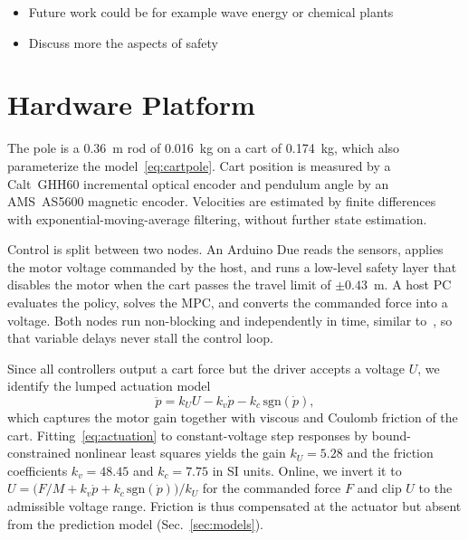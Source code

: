 \documentclass{l4dc2027}
\let\cite\citep
\begin{document}
\begin{itemize}
    \item Future work could be for example wave energy or chemical plants
    \item Discuss more the aspects of safety
\end{itemize}




\appendix

\section{Hardware Platform}
\label{app:hardware}
The pole is a 0.36~m rod of 0.016~kg on a cart of 0.174~kg, which also
parameterize the model~\eqref{eq:cartpole}. Cart position is measured by a
Calt~GHH60 incremental optical encoder and pendulum angle by an AMS~AS5600
magnetic encoder. Velocities are estimated by finite differences with
exponential-moving-average filtering, without further state estimation.

Control is split between two nodes. An Arduino Due reads the sensors, applies
the motor voltage commanded by the host, and runs a low-level safety layer
that disables the motor when the cart passes the travel limit of
$\pm0.43$~m. A host PC evaluates the policy, solves the MPC,  and converts the
commanded force into a voltage. Both nodes run non-blocking and independently
in time, similar to~\cite{bohm2022nonblocking}, so that variable delays never
stall the control loop.

Since all controllers output a cart force but the driver accepts a voltage
$U$, we identify the lumped actuation model
\begin{equation}
  \ddot p = k_U U - k_v\dot p - k_c\,\mathrm{sgn}(\dot p),
  \label{eq:actuation}
\end{equation}
which captures the motor gain together with viscous and Coulomb friction of
the cart. Fitting~\eqref{eq:actuation} to constant-voltage step responses by
bound-constrained nonlinear least squares yields the gain $k_U=5.28$ and the
friction coefficients $k_v=48.45$ and $k_c=7.75$ in SI units. Online, we
invert it to $U=\big(F/M+k_v\dot p+k_c\,\mathrm{sgn}(\dot p)\big)/k_U$ for the
commanded force $F$ and clip $U$ to the admissible voltage range. Friction is
thus compensated at the actuator but absent from the prediction model
(Sec.~\ref{sec:models}).
\end{document}

